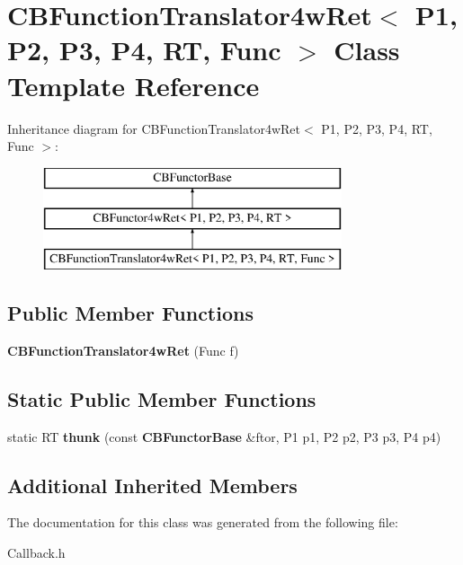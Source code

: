 \section{C\+B\+Function\+Translator4w\+Ret$<$ P1, P2, P3, P4, RT, Func $>$ Class Template Reference}
\label{classCBFunctionTranslator4wRet}
Inheritance diagram for C\+B\+Function\+Translator4w\+Ret$<$ P1, P2, P3, P4, RT, Func $>$\+:\begin{figure}[H]
\begin{center}
\leavevmode
\includegraphics[height=3.000000cm]{classCBFunctionTranslator4wRet}
\end{center}
\end{figure}
\subsection*{Public Member Functions}
\begin{DoxyCompactItemize}
\item 
{\bfseries C\+B\+Function\+Translator4w\+Ret} (Func f)\label{classCBFunctionTranslator4wRet_a9af730c577866db61c9d85d1449f6fae}

\end{DoxyCompactItemize}
\subsection*{Static Public Member Functions}
\begin{DoxyCompactItemize}
\item 
static RT {\bfseries thunk} (const {\bf C\+B\+Functor\+Base} \&ftor, P1 p1, P2 p2, P3 p3, P4 p4)\label{classCBFunctionTranslator4wRet_a9f628525b525c0307d739c66f27bfd46}

\end{DoxyCompactItemize}
\subsection*{Additional Inherited Members}


The documentation for this class was generated from the following file\+:\begin{DoxyCompactItemize}
\item 
Callback.\+h\end{DoxyCompactItemize}
